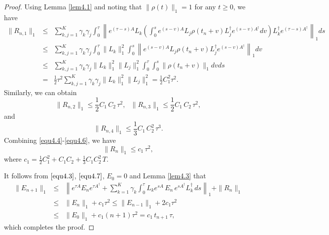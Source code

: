 \documentclass[preprint,3p,compress,12pt]{elsarticle}
\numberwithin{equation}{section}
\numberwithin{figure}{section}
\begin{document}
\begin{proof}
Using Lemma \ref{lem4.1} and noting that $\|\rho(t)\|_1=1$ for any $t\geq0$, we have
\begin{eqnarray}\label{equ4.4}
\|R_{n,1}\|_1&\leq&\sum_{k,j=1}^K\gamma_k\gamma_j\int_0^{\tau}\left\|e^{(\tau-s)A}L_k
  \left(\int_0^se^{(s-v)A}L_j\rho(t_n+v)L_j^{\dag}e^{(s-v)A^{\dag}}dv\right)
  L_k^{\dag}e^{(\tau-s)A^{\dag}}\right\|_1ds\nonumber\\
  &\leq& \sum_{k,j=1}^K\gamma_k\gamma_j\int_0^{\tau}\|L_k\|_1^2
  \int_0^s\left\|e^{(s-v)A}L_j\rho(t_n+v)L_j^{\dag}e^{(s-v)A^{\dag}}\right\|_1dv\nonumber\\
  &\leq& \sum_{k,j=1}^K\gamma_k\gamma_j\|L_k\|_1^2\|L_j\|_1^2
  \int_0^{\tau}\int_0^s\|\rho(t_n+v)\|_1dvds\nonumber\\
  &=&\frac{1}{2}\tau^2\sum_{k,j=1}^K\gamma_k\gamma_j\|L_k\|_1^2\|L_j\|_1^2=\frac{1}{2}C_1^2\tau^2.
\end{eqnarray}
Similarly, we can obtain
\begin{equation}\label{equ4.5}
  \|R_{n,2}\|_1\leq\frac{1}{2}C_1 \, C_2 \, \tau^2,~~~\|R_{n,3}\|_1\leq\frac{1}{2}C_1\, C_2 \, \tau^2,
\end{equation}
and
\begin{equation}\label{equ4.6}
  \|R_{n,4}\|_1\leq\frac{1}{3}C_1 \, C_2^2 \, \tau^3.
\end{equation}
Combining \eqref{equ4.4}-\eqref{equ4.6}, we have
\begin{equation}\label{equ4.7}
  \|R_n\|_1\leq c_1 \, \tau^2,
\end{equation}
where $c_1=\frac{1}{2}C_1^2+C_1C_2+\frac{1}{3}C_1C_2^2 \, T$.

It follows from $\eqref{equ4.3}$, $\eqref{equ4.7}$, $E_0=0$ and Lemma \ref{lem4.3} that
\begin{eqnarray*}
  \|E_{n+1}\|_1&\leq&\left\|e^{\tau A}E_ne^{\tau A^{\dag}}+\sum_{k=1}^K\gamma_k
  \int_0^{\tau}L_ke^{sA} \, E_n  \, e^{sA^{\dag}} L_k^{\dag} \, ds\right\|_1+\|R_n\|_1\\
  &\leq& \|E_n\|_1+c_1\tau^2\leq \|E_{n-1}\|_1+2c_1\tau^2\\
  &\leq& \|E_0\|_1+c_1(n+1)\tau^2=c_1 \, t_{n+1} \, \tau,
\end{eqnarray*}
which completes the proof.
\end{proof}
\end{document}
